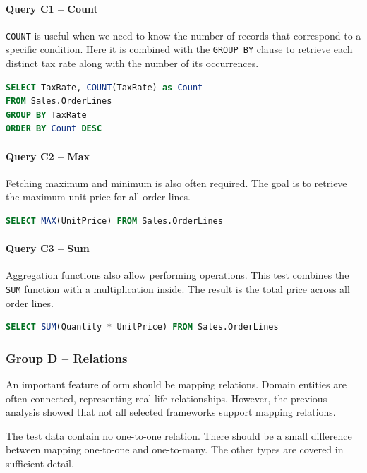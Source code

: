 \paragraph{Query C1 -- Count}
\label{query:c1}
\texttt{COUNT} is useful when we need to know the number of records that correspond to a specific condition. Here it is combined with the \texttt{GROUP BY} clause to retrieve each distinct tax rate along with the number of its occurrences.

\begin{lstlisting}[language=SQL]
SELECT TaxRate, COUNT(TaxRate) as Count 
FROM Sales.OrderLines 
GROUP BY TaxRate 
ORDER BY Count DESC
\end{lstlisting}

\paragraph{Query C2 -- Max}
\label{query:c2}
Fetching maximum and minimum is also often required. The goal is to retrieve the maximum unit price for all order lines.

\begin{lstlisting}[language=SQL]
SELECT MAX(UnitPrice) FROM Sales.OrderLines
\end{lstlisting}

\paragraph{Query C3 -- Sum}
\label{query:c3}
Aggregation functions also allow performing operations. This test combines the \texttt{SUM} function with a multiplication inside. The result is the total price across all order lines.

\begin{lstlisting}[language=SQL]
SELECT SUM(Quantity * UnitPrice) FROM Sales.OrderLines
\end{lstlisting}

\subsubsection{Group D -- Relations}
An important feature of \acrshort{orm} should be mapping relations. Domain entities are often connected, representing real-life relationships.
However, the previous analysis showed that not all selected frameworks support mapping relations.

The test data contain no one-to-one relation. There should be a small difference between mapping one-to-one and one-to-many. The other types are covered in sufficient detail.

